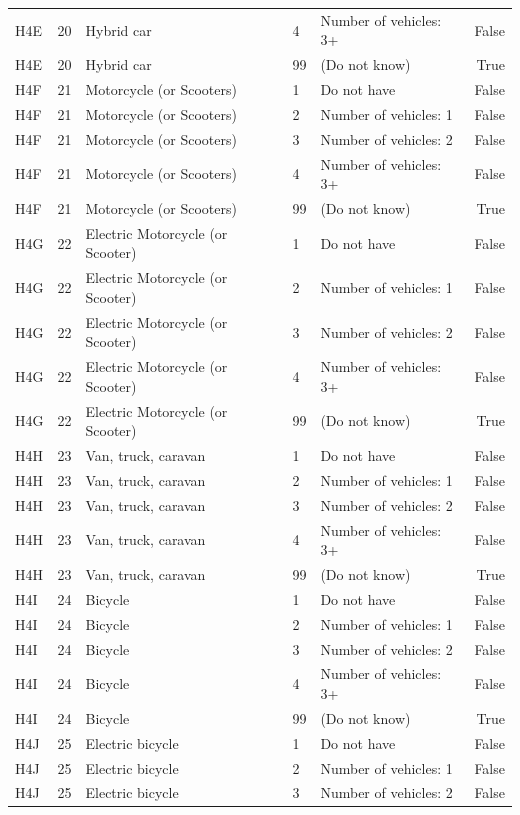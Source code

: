 \begin{tabular}{lrlllr}
H4E & 20 & Hybrid car & 4 & Number of vehicles: 3+ & False \\
H4E & 20 & Hybrid car & 99 & (Do not know) & True \\
H4F & 21 & Motorcycle (or Scooters) & 1 & Do not have & False \\
H4F & 21 & Motorcycle (or Scooters) & 2 & Number of vehicles: 1 & False \\
H4F & 21 & Motorcycle (or Scooters) & 3 & Number of vehicles: 2 & False \\
H4F & 21 & Motorcycle (or Scooters) & 4 & Number of vehicles: 3+ & False \\
H4F & 21 & Motorcycle (or Scooters) & 99 & (Do not know) & True \\
H4G & 22 & Electric Motorcycle (or Scooter) & 1 & Do not have & False \\
H4G & 22 & Electric Motorcycle (or Scooter) & 2 & Number of vehicles: 1 & False \\
H4G & 22 & Electric Motorcycle (or Scooter) & 3 & Number of vehicles: 2 & False \\
H4G & 22 & Electric Motorcycle (or Scooter) & 4 & Number of vehicles: 3+ & False \\
H4G & 22 & Electric Motorcycle (or Scooter) & 99 & (Do not know) & True \\
H4H & 23 & Van, truck, caravan & 1 & Do not have & False \\
H4H & 23 & Van, truck, caravan & 2 & Number of vehicles: 1 & False \\
H4H & 23 & Van, truck, caravan & 3 & Number of vehicles: 2 & False \\
H4H & 23 & Van, truck, caravan & 4 & Number of vehicles: 3+ & False \\
H4H & 23 & Van, truck, caravan & 99 & (Do not know) & True \\
H4I & 24 & Bicycle & 1 & Do not have & False \\
H4I & 24 & Bicycle & 2 & Number of vehicles: 1 & False \\
H4I & 24 & Bicycle & 3 & Number of vehicles: 2 & False \\
H4I & 24 & Bicycle & 4 & Number of vehicles: 3+ & False \\
H4I & 24 & Bicycle & 99 & (Do not know) & True \\
H4J & 25 & Electric bicycle & 1 & Do not have & False \\
H4J & 25 & Electric bicycle & 2 & Number of vehicles: 1 & False \\
H4J & 25 & Electric bicycle & 3 & Number of vehicles: 2 & False \\

\end{tabular}

